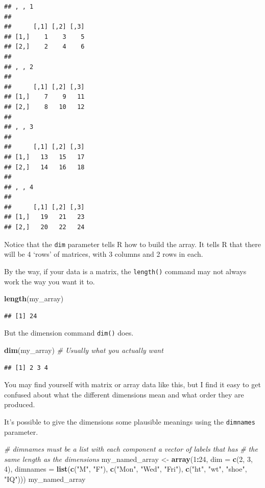 \documentclass[]{article}
\newenvironment{Shaded}{\begin{snugshade}}{\end{snugshade}}
\newcommand{\KeywordTok}[1]{\textcolor[rgb]{0.13,0.29,0.53}{\textbf{#1}}}
\newcommand{\DataTypeTok}[1]{\textcolor[rgb]{0.13,0.29,0.53}{#1}}
\newcommand{\DecValTok}[1]{\textcolor[rgb]{0.00,0.00,0.81}{#1}}
\newcommand{\StringTok}[1]{\textcolor[rgb]{0.31,0.60,0.02}{#1}}
\newcommand{\CommentTok}[1]{\textcolor[rgb]{0.56,0.35,0.01}{\textit{#1}}}
\newcommand{\OperatorTok}[1]{\textcolor[rgb]{0.81,0.36,0.00}{\textbf{#1}}}
\newcommand{\NormalTok}[1]{#1}
\begin{document}
\begin{verbatim}
## , , 1
## 
##      [,1] [,2] [,3]
## [1,]    1    3    5
## [2,]    2    4    6
## 
## , , 2
## 
##      [,1] [,2] [,3]
## [1,]    7    9   11
## [2,]    8   10   12
## 
## , , 3
## 
##      [,1] [,2] [,3]
## [1,]   13   15   17
## [2,]   14   16   18
## 
## , , 4
## 
##      [,1] [,2] [,3]
## [1,]   19   21   23
## [2,]   20   22   24
\end{verbatim}

Notice that the \texttt{dim} parameter tells R how to build the array.
It tells R that there will be 4 `rows' of matrices, with 3 columns and 2
rows in each.

By the way, if your data is a matrix, the \texttt{length()} command may
not always work the way you want it to.

\begin{Shaded}
\begin{Highlighting}[]
\KeywordTok{length}\NormalTok{(my_array)}
\end{Highlighting}
\end{Shaded}

\begin{verbatim}
## [1] 24
\end{verbatim}

But the dimension command \texttt{dim()} does.

\begin{Shaded}
\begin{Highlighting}[]
\KeywordTok{dim}\NormalTok{(my_array)  }\CommentTok{# Usually what you actually want}
\end{Highlighting}
\end{Shaded}

\begin{verbatim}
## [1] 2 3 4
\end{verbatim}

You may find yourself with matrix or array data like this, but I find it
easy to get confused about what the different dimensions mean and what
order they are produced.

It's possible to give the dimensions some plausible meanings using the
\texttt{dimnames} parameter.

\begin{Shaded}
\begin{Highlighting}[]
\CommentTok{# dimnames must be a list with each component a vector of labels that has}
\CommentTok{# the same length as the dimensions}
\NormalTok{my_named_array <-}\StringTok{ }\KeywordTok{array}\NormalTok{(}\DecValTok{1}\OperatorTok{:}\DecValTok{24}\NormalTok{, }\DataTypeTok{dim =} \KeywordTok{c}\NormalTok{(}\DecValTok{2}\NormalTok{, }\DecValTok{3}\NormalTok{, }\DecValTok{4}\NormalTok{), }\DataTypeTok{dimnames =} \KeywordTok{list}\NormalTok{(}\KeywordTok{c}\NormalTok{(}\StringTok{"M"}\NormalTok{, }\StringTok{"F"}\NormalTok{), }
    \KeywordTok{c}\NormalTok{(}\StringTok{"Mon"}\NormalTok{, }\StringTok{"Wed"}\NormalTok{, }\StringTok{"Fri"}\NormalTok{), }\KeywordTok{c}\NormalTok{(}\StringTok{"ht"}\NormalTok{, }\StringTok{"wt"}\NormalTok{, }\StringTok{"shoe"}\NormalTok{, }\StringTok{"IQ"}\NormalTok{)))}
\NormalTok{my_named_array}
\end{Highlighting}
\end{Shaded}
\end{document}
